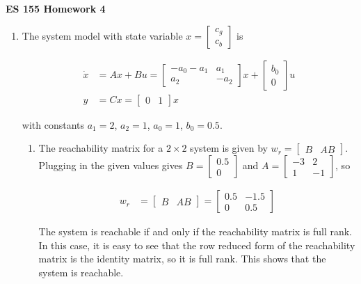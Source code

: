 \documentclass[11pt]{article}
\theoremstyle{definition}
\begin{document}
\textbf{\huge{ES 155 Homework 4}}    %
\normalsize

\begin{enumerate}
    \item %
    The system model with state variable $x = \begin{bmatrix} c_g \\ c_b \end{bmatrix}$ is

    \begin{align*}
        \dot{x} &= Ax + Bu = \begin{bmatrix} -a_0 - a_1 & a_1 \\ a_2 & - a_2 \end{bmatrix} x + \begin{bmatrix} b_0 \\ 0 \end{bmatrix} u \\
        y &= Cx = \begin{bmatrix} 0 & 1 \end{bmatrix} x
    \end{align*}

    with constants $a_1 = 2$, $a_2 = 1$, $a_0 = 1$, $b_0 = 0.5$.

    \begin{enumerate}
        \item %
        The reachability matrix for a $2 \times 2$ system is given by $w_r = \begin{bmatrix} B & AB \end{bmatrix}$.  Plugging in the given values gives $B = \begin{bmatrix} 0.5 \\ 0 \end{bmatrix}$ and $A = \begin{bmatrix} -3 & 2 \\ 1 & -1 \end{bmatrix}$, so 

        \begin{align*}
            w_r &= \begin{bmatrix} B & AB \end{bmatrix} = \begin{bmatrix} 0.5 & -1.5 \\ 0 & 0.5 \end{bmatrix}
        \end{align*}

        The system is reachable if and only if the reachability matrix is full rank.  In this case, it is easy to see that the row reduced form of the reachability matrix is the identity matrix, so it is full rank.  This shows that the system is reachable.


\end{enumerate}
\end{enumerate}
\end{document}

